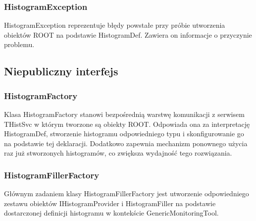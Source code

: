 \subsubsection{HistogramException}
HistogramException reprezentuje błędy powstałe przy próbie utworzenia obiektów ROOT na podstawie HistogramDef.
Zawiera on informacje o przyczynie problemu.

\subsection{Niepubliczny interfejs}

\subsubsection{HistogramFactory}
Klasa HistogramFactory stanowi bezpośrednią warstwę komunikacji z serwisem THistSvc w którym tworzone są obiekty ROOT.
Odpowiada ona za interpretację HistogramDef, stworzenie histogramu odpowiedniego typu i skonfigurowanie go na podstawie tej deklaracji.
Dodatkowo zapewnia mechanizm ponownego użycia raz już stworzonych histogramów, co zwiększa wydajność tego rozwiązania.

\subsubsection{HistogramFillerFactory}
Głównym zadaniem klasy HistogramFillerFactory jest utworzenie odpowiedniego zestawu obiektów IHistogramProvider i HistogramFiller na podstawie dostarczonej definicji histogramu w kontekście GenericMonitoringTool.

